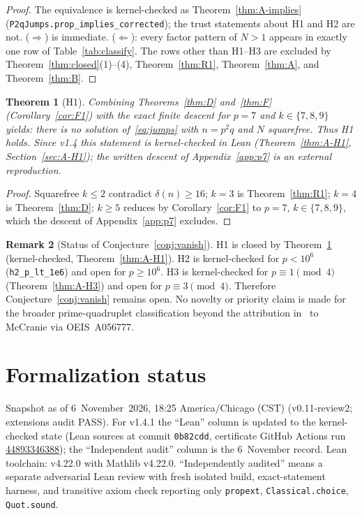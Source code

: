 \documentclass[11pt,reqno]{amsart}
\newtheorem{theorem}{Theorem}
\theoremstyle{definition}
\newtheorem{remark}[theorem]{Remark}
\begin{document}
\begin{proof}
The equivalence is kernel-checked as Theorem~\ref{thm:A-implies} (\texttt{P2qJumps.prop\_implies\_corrected}); the trust statements about H1 and H2 are not. (\(\Rightarrow\)) is immediate. (\(\Leftarrow\)): every factor pattern of \(N>1\) appears in exactly one row of Table~\ref{tab:classify}. The rows other than H1--H3 are excluded by Theorem~\ref{thm:closed}(1)--(4), Theorem~\ref{thm:R1}, Theorem~\ref{thm:A}, and Theorem~\ref{thm:B}.
\end{proof}

\begin{theorem}[H1]
\label{thm:H1-comp}
Combining Theorems~\ref{thm:D} and~\ref{thm:F} (Corollary~\ref{cor:F1}) with the exact finite descent for \(p=7\) and \(k\in\{7,8,9\}\) yields: there is no solution of~\eqref{eq:jumps} with \(n=p^2q\) and \(N\) squarefree. Thus H1 holds. Since v1.4 this statement is kernel-checked in Lean (Theorem~\ref{thm:A-H1}, Section~\ref{sec:A-H1}); the written descent of Appendix~\ref{app:p7} is an external reproduction.
\end{theorem}

\begin{proof}
Squarefree \(k\le 2\) contradict \(\delta(n)\ge 16\); \(k=3\) is Theorem~\ref{thm:R1}; \(k=4\) is Theorem~\ref{thm:D}; \(k\ge 5\) reduces by Corollary~\ref{cor:F1} to \(p=7\), \(k\in\{7,8,9\}\), which the descent of Appendix~\ref{app:p7} excludes.
\end{proof}

\begin{remark}[Status of Conjecture~\ref{conj:vanish}]
H1 is closed by Theorem~\ref{thm:H1-comp} (kernel-checked, Theorem~\ref{thm:A-H1}). H2 is kernel-checked for \(p<10^6\) (\texttt{h2\_p\_lt\_1e6}) and open for \(p\ge 10^6\). H3 is kernel-checked for \(p\equiv 1\pmod 4\) (Theorem~\ref{thm:A-H3}) and open for \(p\equiv 3\pmod 4\). Therefore Conjecture~\ref{conj:vanish} remains open. No novelty or priority claim is made for the broader prime-quadruplet classification beyond the attribution in~\cite{RCW2026} to McCranie via OEIS~A056777.
\end{remark}

\section{Formalization status}
\label{sec:formalization}

Snapshot as of 6~November~2026, 18:25 America/Chicago (CST) (v0.11-review2; extensions audit PASS). For v1.4.1 the ``Lean'' column is updated to the kernel-checked state (Lean sources at commit \texttt{0b82cdd}, certificate GitHub Actions run \href{https://github.com/BenFrohman/p2q-jumps-lean/actions/runs/44893346388}{44893346388}); the ``Independent audit'' column is the 6~November record. Lean toolchain: v4.22.0 with Mathlib v4.22.0. ``Independently audited'' means a separate adversarial Lean review with fresh isolated build, exact-statement harness, and transitive axiom check reporting only \texttt{propext}, \texttt{Classical.choice}, \texttt{Quot.sound}.
\end{document}
